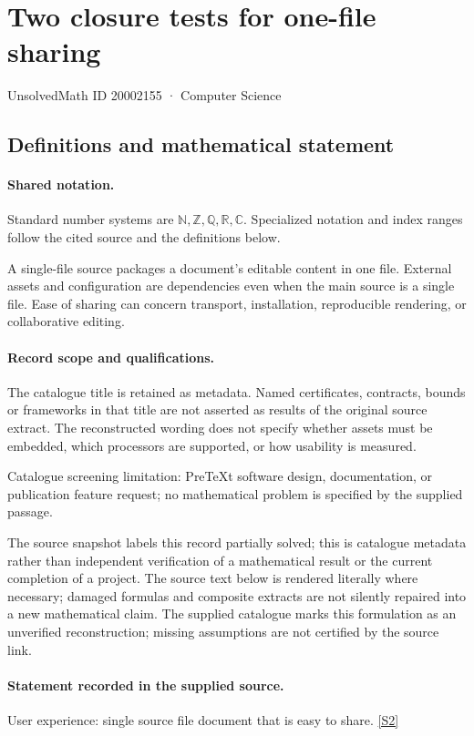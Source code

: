 \documentclass[11pt]{article}
\newcommand{\sref}[2]{\hyperlink{source:#1:#2}{[S#2]}}
\begin{document}
\setcounter{section}{20002154}
\section{Two closure tests for one-file sharing}\label{20002155}
{\small\sffamily UnsolvedMath ID 20002155 · Computer Science}
\subsection{Definitions and mathematical statement}

\paragraph{Shared notation.}Standard number systems are $\mathbb N,\mathbb Z,\mathbb Q,\mathbb R,\mathbb C$. Specialized notation and index ranges follow the cited source and the definitions below.


A single-file source packages a document's editable content in one file. External assets and configuration are dependencies even when the main source is a single file. Ease of sharing can concern transport, installation, reproducible rendering, or collaborative editing.
\paragraph{Record scope and qualifications.}
The catalogue title is retained as metadata. Named certificates, contracts, bounds or frameworks in that title are not asserted as results of the original source extract.
The reconstructed wording does not specify whether assets must be embedded, which processors are supported, or how usability is measured.

Catalogue screening limitation: PreTeXt software design, documentation, or publication feature request; no mathematical problem is specified by the supplied passage.

The source snapshot labels this record partially solved; this is catalogue metadata rather than independent verification of a mathematical result or the current completion of a project.
The source text below is rendered literally where necessary; damaged formulas and composite extracts are not silently repaired into a new mathematical claim.
The supplied catalogue marks this formulation as an unverified reconstruction; missing assumptions are not certified by the source link.
\paragraph{Statement recorded in the supplied source.}
User experience: single source file document that is easy to share. \sref{20002155}{2}
\end{document}
